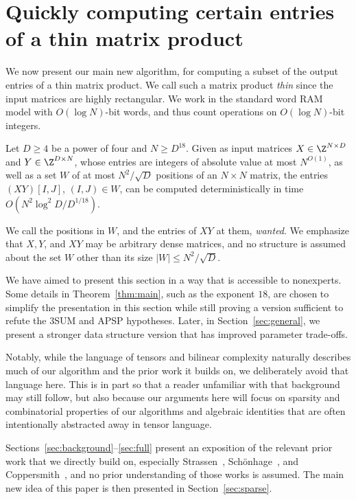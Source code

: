 \section{Quickly computing certain entries of a thin matrix product}\label{sec:result}

We now present our main new algorithm, for computing a subset of the output entries of a thin matrix product. We call such a matrix product \emph{thin} since the input matrices are highly rectangular. We work in the standard word RAM model with $O(\log N)$-bit words, and thus count operations on $O(\log N)$-bit integers.

\begin{theorem}\label{thm:main}
Let $D\ge4$ be a power of four and $N\ge D^{18}$. Given as input matrices $X\in\Z^{N\times D}$ and $Y\in\Z^{D\times N}$, whose entries are integers of absolute value at most $N^{O(1)}$, as well as a set $W$ of at most $N^2/\sqrt D$ positions of an $N \times N$ matrix, the entries $(XY)[I,J]$, $(I,J)\in W$, can be computed deterministically in time $O(N^2\log^2\!D/D^{1/18})$.
\end{theorem}

We call the positions in $W$, and the entries of $XY$ at them, \emph{wanted}. We emphasize that $X, Y$, and $XY$ may be arbitrary dense matrices, and no structure is assumed about the set $W$ other than its size $|W| \leq N^2/\sqrt D$. 

We have aimed to present this section in a way that is accessible to nonexperts. Some details in Theorem~\ref{thm:main}, such as the exponent $18$, are chosen to simplify the presentation in this section while still proving a version sufficient to refute the $3$SUM and APSP hypotheses. Later, in Section~\ref{sec:general}, we present a stronger data structure version that has improved parameter trade-offs.

Notably, while the language of tensors and bilinear complexity naturally describes much of our algorithm and the prior work it builds on, we deliberately avoid that language here. This is in part so that a reader unfamiliar with that background may still follow, but also because our arguments here will focus on sparsity and combinatorial properties of our algorithms and algebraic identities that are often intentionally abstracted away in tensor language.

Sections~\ref{sec:background}--\ref{sec:full} present an exposition of the relevant prior work that we directly build on, especially Strassen~\cite{Str69},  Sch\"onhage~\cite{Sch81}, and Coppersmith~\cite{Cop82}, and no prior understanding of those works is assumed. The main new idea of this paper is then presented in Section~\ref{sec:sparse}. 

